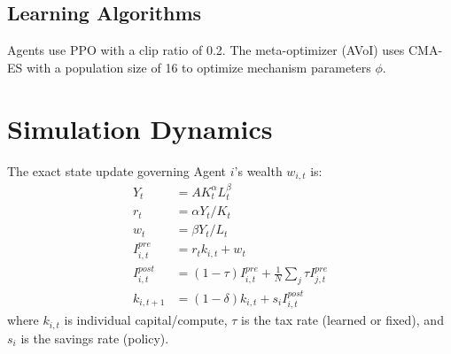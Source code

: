 \documentclass{article}
\begin{document}
\subsection{Learning Algorithms}
Agents use PPO with a clip ratio of 0.2. The meta-optimizer (AVoI) uses CMA-ES with a population size of 16 to optimize mechanism parameters $\phi$.

\section{Simulation Dynamics}
\label{app:sim}

The exact state update governing Agent $i$'s wealth $w_{i,t}$ is:
\begin{align}
    Y_t &= A K_t^\alpha L_t^\beta \\
    r_t &= \alpha Y_t / K_t \\
    w_t &= \beta Y_t / L_t \\
    I_{i,t}^{pre} &= r_t k_{i,t} + w_t \\
    I_{i,t}^{post} &= (1-\tau) I_{i,t}^{pre} + \frac{1}{N} \sum_j \tau I_{j,t}^{pre} \\
    k_{i,t+1} &= (1-\delta) k_{i,t} + s_i I_{i,t}^{post}
\end{align}
where $k_{i,t}$ is individual capital/compute, $\tau$ is the tax rate (learned or fixed), and $s_i$ is the savings rate (policy).
\end{document}
